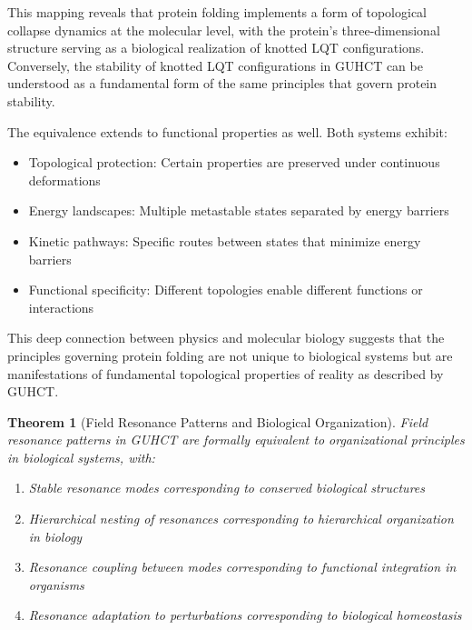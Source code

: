 \documentclass[11pt,a4paper]{article}
\makeatletter
\newtheorem{theorem}{Theorem}[section]
\renewenvironment{proof}[1][\proofname]{\par
  \pushQED{\qed}%
  \normalfont \topsep6\p@\@plus6\p@\relax
  \trivlist
  \item[\hskip\labelsep
        \itshape
    #1\@addpunct{.}]\ignorespaces
}{%
  \popQED\endtrivlist\@endpefalse
}
\makeatother
\begin{document}
\begin{proof}
This mapping reveals that protein folding implements a form of topological collapse dynamics at the molecular level, with the protein's three-dimensional structure serving as a biological realization of knotted LQT configurations. Conversely, the stability of knotted LQT configurations in GUHCT can be understood as a fundamental form of the same principles that govern protein stability.

The equivalence extends to functional properties as well. Both systems exhibit:
\begin{itemize}
    \item Topological protection: Certain properties are preserved under continuous deformations
    \item Energy landscapes: Multiple metastable states separated by energy barriers
    \item Kinetic pathways: Specific routes between states that minimize energy barriers
    \item Functional specificity: Different topologies enable different functions or interactions
\end{itemize}

This deep connection between physics and molecular biology suggests that the principles governing protein folding are not unique to biological systems but are manifestations of fundamental topological properties of reality as described by GUHCT.
\end{proof}

\begin{theorem}[Field Resonance Patterns and Biological Organization]
\label{thm:resonance_organization}
Field resonance patterns in GUHCT are formally equivalent to organizational principles in biological systems, with:
\begin{enumerate}
    \item Stable resonance modes corresponding to conserved biological structures
    \item Hierarchical nesting of resonances corresponding to hierarchical organization in biology
    \item Resonance coupling between modes corresponding to functional integration in organisms
    \item Resonance adaptation to perturbations corresponding to biological homeostasis
\end{enumerate}
\end{theorem}
\end{document}
